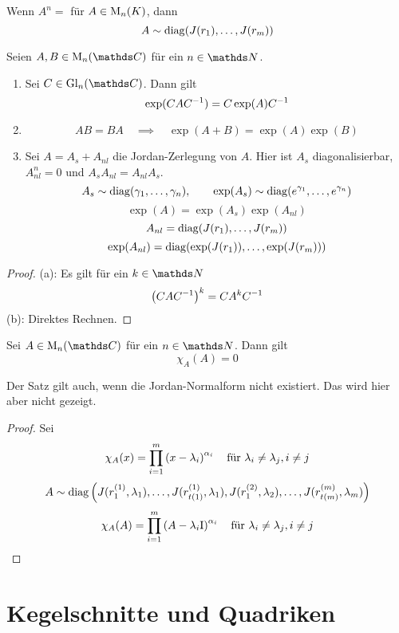 		\begin{proposition}
			Wenn $A^n=$ für $A\in\mathrm{M}_n(K)$, dann
			\[ A\sim \operatorname{diag}(J(r_1),\ldots,J(r_m)) \]
		\end{proposition}

		\begin{proposition}[Eigenschaften]
			Seien $A,B\in\m{M}_n(\SC)$ für ein $n\in\SN$.
			\begin{enumerate}[label=\normalfont(\alph*)]
				\item Sei $C\in\m{Gl}_n(\SC)$. Dann gilt
					\[ \exp(CA{C}^{-1}) = C\exp(A){C}^{-1} \]
				\item 
					\[ AB=BA \quad \implies \quad \exp(A+B)=\exp(A)\exp(B) \]
				\item Sei $A=A_s + A_{nl}$ die Jordan-Zerlegung von $A$.
					Hier ist $A_s$ diagonalisierbar, $A^n_{nl}=0$ und $A_sA_{nl}=A_{nl}A_s$.
					\[ A_s\sim \operatorname{diag}(\gamma_1,\ldots,\gamma_n),\qquad \exp(A_s)\sim \operatorname{diag}(e^{\gamma_1},\ldots,e^{\gamma_n}) \]
					\[ \exp(A) = \exp(A_s)\exp(A_{nl}) \]
					\[ A_{nl} = \operatorname{diag}(J(r_1),\ldots,J(r_m)) \]
					\[ \exp(A_{nl}) = \operatorname{diag}(\exp(J(r_1)),\ldots,\exp(J(r_m))) \]
			\end{enumerate}
		\end{proposition}
		\begin{proof}
			(a): Es gilt für ein $k\in\SN$
			\[ \left( CA{C}^{-1} \right)^k = CA^k{C}^{-1} \]
			(b): Direktes Rechnen.
		\end{proof}

		\begin{theorem}
			Sei $A\in\m{M}_n(\SC)$ für ein $n\in\SN$.
			Dann gilt
			\[ \chi_A(A) = 0 \]
		\end{theorem}
		Der Satz gilt auch, wenn die Jordan-Normalform nicht existiert.
		Das wird hier aber nicht gezeigt.
		\begin{proof}
			Sei 
			\[ \chi_A(x) = \prod_{i=1}^m \left( x-\lambda_i \right)^{\alpha_i} \quad \text{für } \lambda_i\neq\lambda_j,i\neq j \]
			\[ A\sim \operatorname{diag}\left(  J(r_1^{(1)}, \lambda_1),\ldots,J(r_{t(1)}^{(1)},\lambda_1), J(r_1^{(2)}, \lambda_2),\ldots,J(r_{t(m)}^{(m)},\lambda_m)  \right) \]
			\[ \chi_A(A) = \prod_{i=1}^m \left( A-\lambda_i\mathrm{I} \right)^{\alpha_i} \quad \text{für } \lambda_i\neq\lambda_j,i\neq j \]
		\end{proof}


	\section{Kegelschnitte und Quadriken} %
	\label{sec:kegelschnitte_und_quadriken}
	
